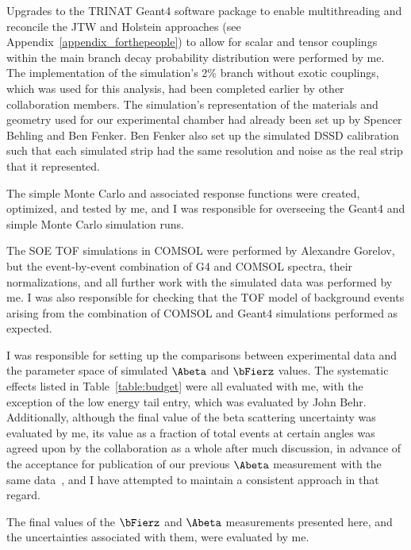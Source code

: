 Upgrades to the TRINAT Geant4 software package to enable multithreading and reconcile the \acs{JTW} and Holstein approaches (see Appendix~\ref{appendix_forthepeople}) to allow for scalar and tensor couplings within the main branch decay probability distribution were performed by me.  The implementation of the simulation's 2\% branch without exotic couplings, which was used for this analysis, had been completed earlier by other collaboration members.
The simulation's representation of the materials and geometry used for our experimental chamber had already been set up by Spencer Behling and Ben Fenker.  Ben Fenker also set up the simulated DSSD calibration such that each simulated strip had the same resolution and noise as the real strip that it represented.  

The simple Monte Carlo and associated response functions were created, optimized, and tested by me, and I was responsible for overseeing the Geant4 and simple Monte Carlo simulation runs.  


The \ac{SOE} \ac{TOF} simulations in COMSOL were performed by Alexandre Gorelov, but the event-by-event combination of G4 and COMSOL spectra, their normalizations, and all further work with the simulated data was performed by me.  I was also responsible for checking that the TOF model of background events arising from the combination of COMSOL and Geant4 simulations performed as expected.  

I was responsible for setting up the comparisons between experimental data and the parameter space of simulated $\Abeta$ and $\bFierz$ values.  The systematic effects listed in Table~\ref{table:budget} were all evaluated with me, with the exception of the low energy tail entry, which was evaluated by John Behr.  Additionally, although the final value of the beta scattering uncertainty was evaluated by me, its value as a fraction of total events at certain angles was agreed upon by the collaboration as a whole after much discussion, in advance of the acceptance for publication of our previous $\Abeta$ measurement with the same data~\cite{ben_Abeta}, and I have attempted to maintain a consistent approach in that regard.  

The final values of the $\bFierz$ and $\Abeta$ measurements presented here, and the uncertainties associated with them, were evaluated by me.  

